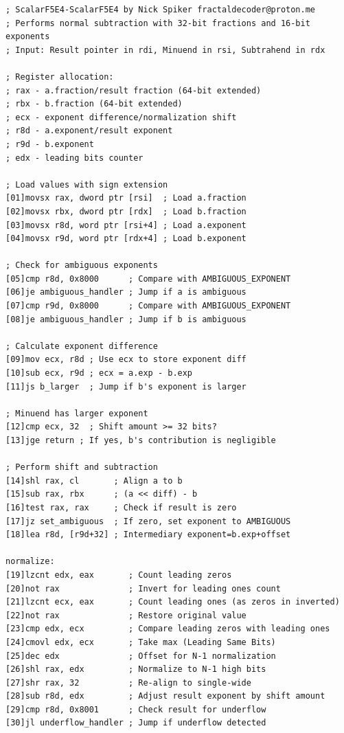 \documentclass[12pt,letter]{article}
\begin{document}
\begin{lstlisting}[style=rust, caption={Assembly Implementation of Scalar Subtraction}, label={fig:scalar_subtract}]
; ScalarF5E4-ScalarF5E4 by Nick Spiker fractaldecoder@proton.me
; Performs normal subtraction with 32-bit fractions and 16-bit exponents
; Input: Result pointer in rdi, Minuend in rsi, Subtrahend in rdx

; Register allocation:
; rax - a.fraction/result fraction (64-bit extended)
; rbx - b.fraction (64-bit extended)
; ecx - exponent difference/normalization shift
; r8d - a.exponent/result exponent
; r9d - b.exponent
; edx - leading bits counter

; Load values with sign extension
[01]movsx rax, dword ptr [rsi]  ; Load a.fraction
[02]movsx rbx, dword ptr [rdx]  ; Load b.fraction
[03]movsx r8d, word ptr [rsi+4] ; Load a.exponent
[04]movsx r9d, word ptr [rdx+4] ; Load b.exponent

; Check for ambiguous exponents
[05]cmp r8d, 0x8000      ; Compare with AMBIGUOUS_EXPONENT
[06]je ambiguous_handler ; Jump if a is ambiguous
[07]cmp r9d, 0x8000      ; Compare with AMBIGUOUS_EXPONENT
[08]je ambiguous_handler ; Jump if b is ambiguous

; Calculate exponent difference
[09]mov ecx, r8d ; Use ecx to store exponent diff
[10]sub ecx, r9d ; ecx = a.exp - b.exp
[11]js b_larger  ; Jump if b's exponent is larger

; Minuend has larger exponent
[12]cmp ecx, 32  ; Shift amount >= 32 bits?
[13]jge return ; If yes, b's contribution is negligible

; Perform shift and subtraction
[14]shl rax, cl       ; Align a to b
[15]sub rax, rbx      ; (a << diff) - b
[16]test rax, rax     ; Check if result is zero
[17]jz set_ambiguous  ; If zero, set exponent to AMBIGUOUS
[18]lea r8d, [r9d+32] ; Intermediary exponent=b.exp+offset

normalize:
[19]lzcnt edx, eax       ; Count leading zeros
[20]not rax              ; Invert for leading ones count
[21]lzcnt ecx, eax       ; Count leading ones (as zeros in inverted)
[22]not rax              ; Restore original value
[23]cmp edx, ecx         ; Compare leading zeros with leading ones
[24]cmovl edx, ecx       ; Take max (Leading Same Bits)
[25]dec edx              ; Offset for N-1 normalization
[26]shl rax, edx         ; Normalize to N-1 high bits
[27]shr rax, 32          ; Re-align to single-wide
[28]sub r8d, edx         ; Adjust result exponent by shift amount
[29]cmp r8d, 0x8001      ; Check result for underflow
[30]jl underflow_handler ; Jump if underflow detected


\end{lstlisting}
\end{document}
